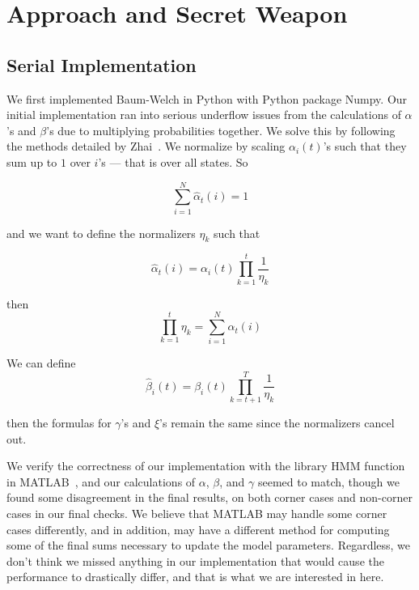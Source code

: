 \section{Approach and Secret Weapon}

\subsection{Serial Implementation}
We first implemented Baum-Welch in Python with Python package Numpy. Our initial
implementation ran into serious underflow issues from the calculations of
$\alpha$'s and $\beta$'s due to multiplying probabilities together. We solve
this by following the methods detailed by Zhai~\cite{normalizer}. We normalize by scaling $\alpha_i(t)$'s such that they sum up to $1$ over $i$'s --- that is over all states. So 

\begin{equation} 
\sum_{i=1}^N \hat{\alpha}_t(i) = 1
\end{equation}

and we want to define the normalizers $\eta_k$ such that

\begin{equation} 
    \hat{\alpha}_t(i) = \alpha_i(t) \prod_{k=1}^t \frac{1}{\eta_k}
\end{equation}

then 
\begin{equation}
\prod_{k=1}^t \eta_k =\sum_{i=1}^N \alpha_t(i)
\end{equation}

We can define 
\begin{equation} 
    \hat{\beta}_{i}(t) = \beta_{i}(t) \prod_{k=t+1}^T \frac{1}{\eta_k}
\end{equation}

then the formulas for $\gamma$'s and $\xi$'s remain the same since the normalizers cancel out.

We verify the correctness of our implementation with the library HMM function in
MATLAB~\cite{matlab}, and our calculations of $\alpha$, $\beta$, and $\gamma$ seemed to match, though we found some disagreement in the final results, on both corner cases and non-corner cases in our final checks.  We believe that MATLAB may handle some corner cases differently, and in addition, may have a different method for computing some of the final sums necessary to update the model parameters.  Regardless, we don't think we missed anything in our implementation that would cause the performance to drastically differ, and that is what we are interested in here. 

